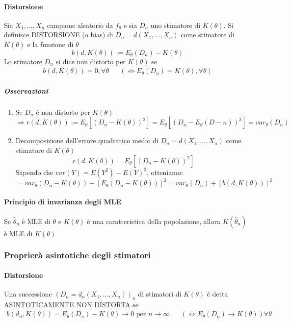 \documentclass{article}
\begin{document}
	\paragraph{Distorsione}
	Sia $X_1,...,X_n$ campione aleatorio da $f_\theta$ e sia $D_n$ uno stimatore di $K(\theta)$. Si definisce DISTORSIONE (o bias) di $D_n = d(X_1,...,X_n)$ come stimatore di $K(\theta)$ e la funzione di $\theta$
	\begin{equation}
		b(d,K(\theta)) := E_\theta(D_n) - K(\theta)
	\end{equation}
	Lo stimatore $D_n$ si dice non distorto per $K(\theta)$ se
	\begin{align}
		b(d,K(\theta)) = 0, \forall\theta && (\Longleftrightarrow E_\theta(D_n) = K(\theta), \forall\theta)
	\end{align}
	\subparagraph{Osservazioni}
		\begin{enumerate}
			\item Se $D_n$ è non distorto per $K(\theta)$
				\begin{equation*}
					\Rightarrow r(d,K(\theta)):=E_\theta[(D_n-K(\theta))^2]=E_\theta[(D_n-E_\theta(D-n))^2] = var_\theta(D_n)
				\end{equation*}
			\item Decomposizione dell'errore quadratico medio di $D_n = d(X_1,...,X_n)$ come stimatore di $K(\theta)$
				\begin{equation}
					r(d,K(\theta)) = E_\theta[(D_n-K(\theta))^2]
				\end{equation}
				Sapendo che $var(Y) = E(Y^2) - E(Y)^2$, otteniamo:
				\begin{equation}
					= var_\theta(D_n-K(\theta)) + [E_\theta(D_n-K(\theta))]^2 = var_\theta(D_n) + [b(d,K(\theta))]^2
				\end{equation}			
		\end{enumerate}
	\paragraph{Principio di invarianza degli MLE}
	Se $\widehat{\theta}_n$ è MLE di $\theta$ e $K(\theta)$ è una caratteristica della popolazione, allora $K(\widehat{\theta}_n)$ è MLE di $K(\theta)$
	
	\subsubsection{Proprierà asintotiche degli stimatori}
	\paragraph{Distorsione}
	Una successione $(D_n=d_n(X_1,...,X_n))_n$ di stimatori di $K(\theta)$ è detta ASINTOTICAMENTE NON DISTORTA se
	\begin{align*}
		b(d_n,K(\theta)) = E_\theta(D_n)-K(\theta) \to 0 \text{ per } n\to\infty && 
		(\Longleftrightarrow E_\theta(D_n)\to K(\theta))\forall\theta
	\end{align*}
\end{document}
